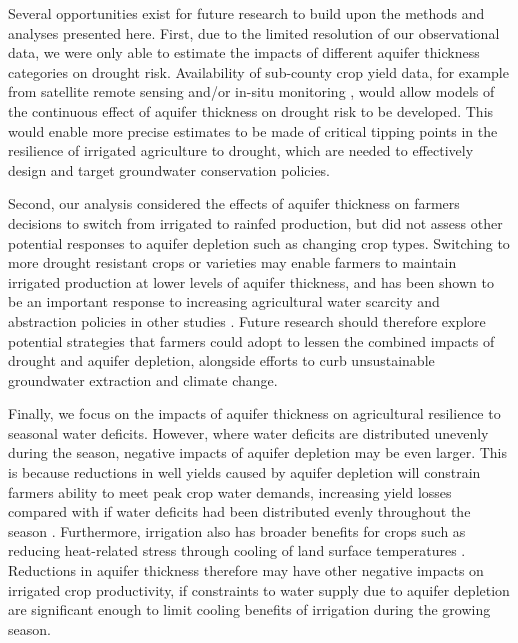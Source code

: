 \documentclass[
]{article}
\begin{document}
Several opportunities exist for future research to build upon the methods and analyses presented here. First, due to the limited resolution of our observational data, we were only able to estimate the impacts of different aquifer thickness categories on drought risk. Availability of sub-county crop yield data, for example from satellite remote sensing and/or in-situ monitoring \citep{edreira2020combining, deines2021million}, would allow models of the continuous effect of aquifer thickness on drought risk to be developed. This would enable more precise estimates to be made of critical tipping points in the resilience of irrigated agriculture to drought, which are needed to effectively design and target groundwater conservation policies.

Second, our analysis considered the effects of aquifer thickness on farmers decisions to switch from irrigated to rainfed production, but did not assess other potential responses to aquifer depletion such as changing crop types. Switching to more drought resistant crops or varieties may enable farmers to maintain irrigated production at lower levels of aquifer thickness, and has been shown to be an important response to increasing agricultural water scarcity and abstraction policies in other studies \citep{bhattarai2021impact, deines2019quantifying, manning2017producer}. Future research should therefore explore potential strategies that farmers could adopt to lessen the combined impacts of drought and aquifer depletion, alongside efforts to curb unsustainable groundwater extraction and climate change.

Finally, we focus on the impacts of aquifer thickness on agricultural resilience to seasonal water deficits. However, where water deficits are distributed unevenly during the season, negative impacts of aquifer depletion may be even larger. This is because reductions in well yields caused by aquifer depletion will constrain farmers ability to meet peak crop water demands, increasing yield losses compared with if water deficits had been distributed evenly throughout the season \citep{ortiz2019unpacking}. Furthermore, irrigation also has broader benefits for crops such as reducing heat-related stress through cooling of land surface temperatures \citep{adegoke2003impact, bonfils2007empirical, lobell2008effect, zhu2022untangling}. Reductions in aquifer thickness therefore may have other negative impacts on irrigated crop productivity, if constraints to water supply due to aquifer depletion are significant enough to limit cooling benefits of irrigation during the growing season.
\end{document}
